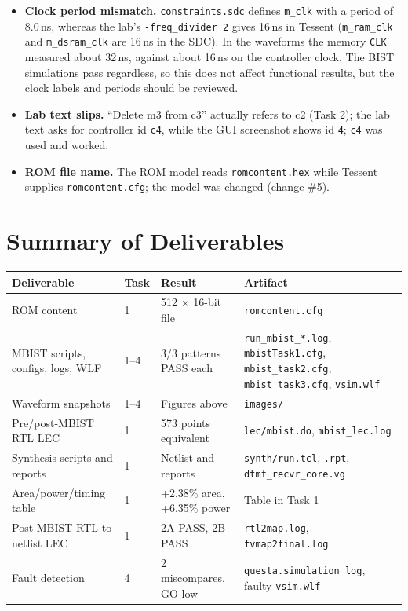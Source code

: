 \documentclass[11pt]{article}
\newcommand{\code}[1]{\texttt{\small #1}}
\begin{document}
\begin{itemize}
  \item \textbf{Clock period mismatch.} \code{constraints.sdc} defines \code{m\_clk} with a period of 8.0\,ns, whereas the lab's \code{-freq\_divider 2} gives 16\,ns in Tessent
        (\code{m\_ram\_clk} and \code{m\_dsram\_clk} are 16\,ns in the SDC). In the waveforms the memory \code{CLK} measured about 32\,ns, against about 16\,ns on the controller clock. The BIST
        simulations pass regardless, so this does not affect functional results, but the clock labels and periods should be reviewed.
  \item \textbf{Lab text slips.} ``Delete m3 from c3'' actually refers to c2 (Task 2); the lab text asks for controller id \code{c4}, while the GUI screenshot shows id \code{4}; \code{c4} was used and worked.
  \item \textbf{ROM file name.} The ROM model reads \code{romcontent.hex} while Tessent supplies \code{romcontent.cfg}; the model was changed (change \#5).
\end{itemize}

\section{Summary of Deliverables}

\begin{center}
\small
\begin{tabular}{@{}p{3.4cm}p{3.2cm}p{3.5cm}p{4.2cm}@{}}
\toprule
\textbf{Deliverable} & \textbf{Task} & \textbf{Result} & \textbf{Artifact} \\ \midrule
ROM content & 1 & 512 $\times$ 16-bit file & \code{romcontent.cfg} \\
MBIST scripts, configs, logs, WLF & 1--4 & 3/3 patterns PASS each & \code{run\_mbist\_*.log}, \code{mbistTask1.cfg}, \code{mbist\_task2.cfg}, \code{mbist\_task3.cfg}, \code{vsim.wlf} \\
Waveform snapshots & 1--4 & Figures above & \code{images/} \\
Pre/post-MBIST RTL LEC & 1 & 573 points equivalent & \code{lec/mbist.do}, \code{mbist\_lec.log} \\
Synthesis scripts and reports & 1 & Netlist and reports & \code{synth/run.tcl}, \code{*.rpt}, \code{dtmf\_recvr\_core.vg} \\
Area/power/timing table & 1 & +2.38\% area, +6.35\% power & Table in Task 1 \\
Post-MBIST RTL to netlist LEC & 1 & 2A PASS, 2B PASS & \code{rtl2map.log}, \code{fvmap2final.log} \\
Fault detection & 4 & 2 miscompares, GO low & \code{questa.simulation\_log}, faulty \code{vsim.wlf} \\ \bottomrule
\end{tabular}
\end{center}
\end{document}
